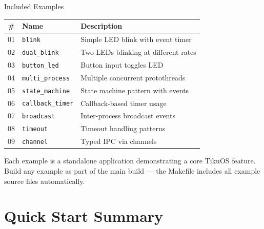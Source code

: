 \documentclass[aspectratio=169, 10pt]{beamer}
\begin{document}
\begin{frame}[fragile]{Included Examples}
\begin{table}
\centering
\small
\begin{tabular}{@{}clp{6.5cm}@{}}
\toprule
\textbf{\#} & \textbf{Name} & \textbf{Description} \\
\midrule
01 & \texttt{blink}          & Simple LED blink with event timer \\
02 & \texttt{dual\_blink}    & Two LEDs blinking at different rates \\
03 & \texttt{button\_led}    & Button input toggles LED \\
04 & \texttt{multi\_process} & Multiple concurrent protothreads \\
05 & \texttt{state\_machine} & State machine pattern with events \\
06 & \texttt{callback\_timer}& Callback-based timer usage \\
07 & \texttt{broadcast}      & Inter-process broadcast events \\
08 & \texttt{timeout}        & Timeout handling patterns \\
09 & \texttt{channel}        & Typed IPC via channels \\
\bottomrule
\end{tabular}
\end{table}

\vspace{0.3em}
Each example is a standalone application demonstrating a core TikuOS feature.
Build any example as part of the main build — the Makefile includes all example
source files automatically.
\end{frame}

\section{Quick Start Summary}
\end{document}
